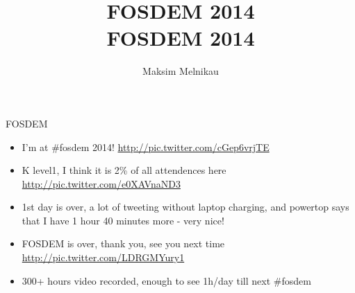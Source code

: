 \documentclass[aspectratio=169]{beamer}
\begin{document}
\title{FOSDEM 2014}
\author{Maksim Melnikau}
\date{}

{
\title{
    \\
    {\huge FOSDEM 2014}
    \\
}

\begin{frame}[plain]{}
    \titlepage
\end{frame}
}


\begin{frame}{FOSDEM}
  \begin{itemize}
  \item I'm at \#fosdem 2014! \url{http://pic.twitter.com/cGep6vrjTE}
  \item K level1, I think it is 2\% of all attendences here \url{http://pic.twitter.com/e0XAVnaND3}
  \item 1st day is over, a lot of tweeting without laptop charging, and powertop says that I have 1 hour 40 minutes more - very nice!
  \item FOSDEM is over, thank you, see you next time \url{http://pic.twitter.com/LDRGMYury1}
  \item 300+ hours video recorded, enough to see 1h/day till next \#fosdem
 \end{itemize}
\end{frame}
\end{document}
